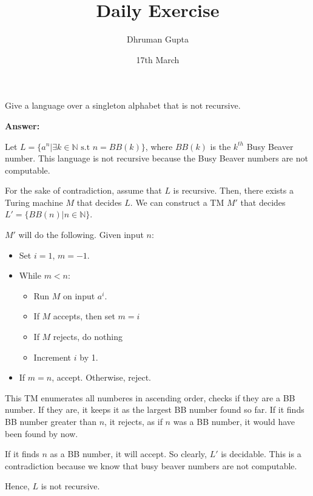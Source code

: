 \documentclass[11pt]{article}
\title{Daily Exercise}
\author{Dhruman Gupta}
\date{17th March}
\begin{document}

Give a language over a singleton alphabet that is not recursive.

\textbf{Answer:}

Let $L = \{a^n | \exists k \in \mathbb{N} \text{ s.t } n = BB(k)\}$, where $BB(k)$ is the $k^{th}$ Busy Beaver number. This language is not recursive because the Busy Beaver numbers are not computable.

For the sake of contradiction, assume that $L$ is recursive. Then, there exists a Turing machine $M$ that decides $L$. We can construct a TM $M'$ that decides $L' = \{BB(n) | n \in \mathbb{N}\}$.

$M'$ will do the following. Given input $n$:
\begin{itemize}
    \item Set $i = 1$, $m = -1$.
    \item While $m < n$:
    \begin{itemize}
        \item Run $M$ on input $a^i$.
        \item If $M$ accepts, then set $m = i$
        \item If $M$ rejects, do nothing
        \item Increment $i$ by 1.
    \end{itemize}
    \item If $m = n$, accept. Otherwise, reject.
\end{itemize}

This TM enumerates all numberes in ascending order, checks if they are a BB number. If they are, it keeps it as the largest BB number found so far. If it finds BB number greater than $n$, it rejects, as if $n$ was a BB number, it would have been found by now.

If it finds $n$ as a BB number, it will accept. So clearly, $L'$ is decidable. This is a contradiction because we know that busy beaver numbers are not computable.

Hence, $L$ is not recursive.
\end{document}
